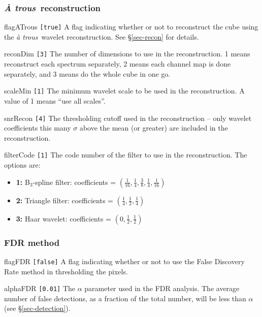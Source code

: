 \documentclass[12pt,a4paper]{article}
\newcommand{\atrous}{\textit{{\`a} trous}}
\newcommand{\Atrous}{\textit{{\`A} trous}}
\newcommand{\entrylabel}[1]{\mbox{\textsf{\bf{#1:}}}\hfil}
\newenvironment{entry}
        {\begin{list}{}%
                {\renewcommand{\makelabel}{\entrylabel}%
                        \setlength{\labelwidth}{30mm}%
                        \setlength{\labelsep}{5pt}%
                        \setlength{\itemsep}{2pt}%
                        \setlength{\parsep}{2pt}%
                        \setlength{\leftmargin}{35mm}%
                }%
        }%
{\end{list}}
\begin{document}
\subsubsection*{\Atrous\ reconstruction}
\begin{entry}
\item [flagATrous \texttt{[true]}] A flag indicating whether or not to
  reconstruct the cube using the \atrous\ wavelet
  reconstruction. See \S\ref{sec-recon} for details.
\item[reconDim \texttt{[3]}] The number of dimensions to use in the
  reconstruction. 1 means reconstruct each spectrum separately, 2
  means each channel map is done separately, and 3 means do the whole
  cube in one go.
\item[scaleMin \texttt{[1]}] The minimum wavelet scale to be used in the
  reconstruction. A value of 1 means ``use all scales''.
\item[snrRecon \texttt{[4]}] The thresholding cutoff used in the
  reconstruction -- only wavelet coefficients this many $\sigma$ above
  the mean (or greater) are included in the reconstruction. 
\item[filterCode \texttt{[1]}] The code number of the filter to use in
  the reconstruction. The options are:
  \begin{itemize}
  \item \textbf{1:} B$_3$-spline filter: coefficients = 
    $(\frac{1}{16}, \frac{1}{4}, \frac{3}{8}, \frac{1}{4}, \frac{1}{16})$
  \item \textbf{2:} Triangle filter: coefficients = $(\frac{1}{4}, \frac{1}{2}, \frac{1}{4})$
  \item \textbf{3:} Haar wavelet: coefficients = $(0, \frac{1}{2}, \frac{1}{2})$
  \end{itemize}
\end{entry}

\subsubsection*{FDR method}
\begin{entry}
\item[flagFDR \texttt{[false]}] A flag indicating whether or not to use
  the False Discovery Rate method in thresholding the pixels.
\item[alphaFDR \texttt{[0.01]}] The $\alpha$ parameter used in the FDR
analysis. The average number of false detections, as a fraction of the
total number, will be less than $\alpha$ (see \S\ref{sec-detection}).
\end{entry}
\end{document}
